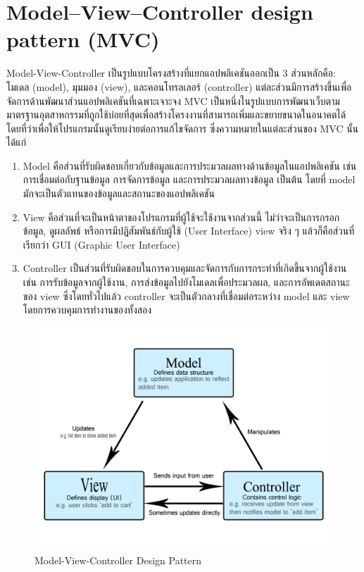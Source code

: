 \section{Model–View–Controller design pattern (MVC)}
Model-View-Controller \cite{mvc} เป็นรูปแบบโครงสร้างที่แยกแอปพลิเคชันออกเป็น 3 ส่วนหลักคือ: โมเดล (model), มุมมอง (view), 
และคอนโทรลเลอร์ (controller) แต่ละส่วนมีการสร้างขึ้นเพื่อจัดการด้านพัฒนาส่วนแอปพลิเคชันที่เฉพาะเจาะจง MVC 
เป็นหนึ่งในรูปแบบการพัฒนาเว็บตามมาตรฐานอุตสาหกรรมที่ถูกใช้บ่อยที่สุดเพื่อสร้างโครงงานที่สามารถเพิ่มและขยายขนาดในอนาคตได้ 
โดยที่ว่าเพื่อให้โปรแกรมนั้นดูเรียบง่ายต่อการแก้ไขจัดการ ซึ่งความหมายในแต่ละส่วนของ MVC นั้นได้แก่ 
\begin{enumerate}
  \item Model คือส่วนที่รับผิดชอบเกี่ยวกับข้อมูลและการประมวลผลทางด้านข้อมูลในแอปพลิเคชัน เช่น การเชื่อมต่อกับฐานข้อมูล การจัดการข้อมูล 
  และการประมวลผลทางข้อมูล เป็นต้น โดยที่ model มักจะเป็นตัวแทนของข้อมูลและสถานะของแอปพลิเคชัน
  \item View คือส่วนที่จะเป็นหน้าตาของโปรแกรมที่ผู้ใช้จะใช้งานจากส่วนนี้ ไม่ว่าจะเป็นการกรอกข้อมูล, ดูผลลัพธ์ หรือการมีปฏิสัมพันธ์กับผู้ใช้ 
  (User Interface) view จริง ๆ แล้วก็คือส่วนที่เรียกว่า GUI (Graphic User Interface) 
  \item Controller เป็นส่วนที่รับผิดชอบในการควบคุมและจัดการกับการกระทำที่เกิดขึ้นจากผู้ใช้งาน เช่น การรับข้อมูลจากผู้ใช้งาน, 
  การส่งข้อมูลไปยังโมเดลเพื่อประมวลผล, และการอัพเดตสถานะของ view ซึ่งโดยทั่วไปแล้ว controller จะเป็นตัวกลางที่เชื่อมต่อระหว่าง model 
  และ view โดยการควบคุมการทำงานของทั้งสอง 
\end{enumerate}
\begin{figure}[h]
  \begin{center}
  \includegraphics[scale=0.3]{resources/MVC.png}
  \end{center}
  \caption[Model-View-Controller]{Model-View-Controller Design Pattern}
  \label{fig:mvc}
\end{figure}

